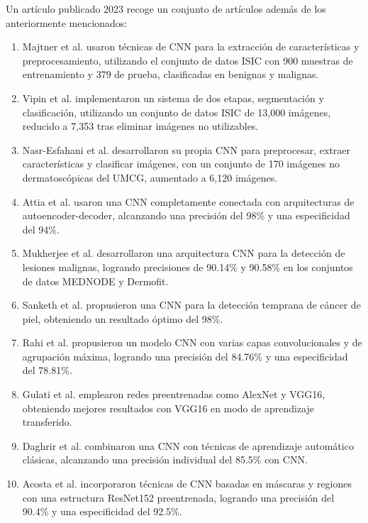 Un artículo publicado 2023  recoge un conjunto de artículos además de los anteriormente mencionados:
\begin{enumerate}
    \item Majtner et al. usaron técnicas de CNN para la extracción de características y preprocesamiento, utilizando el conjunto de datos ISIC con 900 muestras de entrenamiento y 379 de prueba, clasificadas en benignas y malignas. 

    \item Vipin et al.  implementaron un sistema de dos etapas, segmentación y clasificación, utilizando un conjunto de datos ISIC de 13,000 imágenes, reducido a 7,353 tras eliminar imágenes no utilizables. 

    \item Nasr-Esfahani et al.  desarrollaron su propia CNN para preprocesar, extraer características y clasificar imágenes, con un conjunto de 170 imágenes no dermatoscópicas del UMCG, aumentado a 6,120 imágenes. 

    \item Attia et al. usaron una CNN completamente conectada con arquitecturas de autoencoder-decoder, alcanzando una precisión del 98\% y una especificidad del 94\%. 

    \item Mukherjee et al. desarrollaron una arquitectura CNN para la detección de lesiones malignas, logrando precisiones de 90.14\% y 90.58\% en los conjuntos de datos MEDNODE y Dermofit. 

    \item Sanketh et al. propusieron una CNN para la detección temprana de cáncer de piel, obteniendo un resultado óptimo del 98\%. 

    \item Rahi et al. propusieron un modelo CNN con varias capas convolucionales y de agrupación máxima, logrando una precisión del 84.76\% y una especificidad del 78.81\%. 

    \item Gulati et al. emplearon redes preentrenadas como AlexNet y VGG16, obteniendo mejores resultados con VGG16 en modo de aprendizaje transferido.
    \item Daghrir et al. combinaron una CNN con técnicas de aprendizaje automático clásicas, alcanzando una precisión individual del 85.5\% con CNN. 

    \item Acosta et al. incorporaron técnicas de CNN basadas en máscaras y regiones con una estructura ResNet152 preentrenada, logrando una precisión del 90.4\% y una especificidad del 92.5\%.

\end{enumerate}


